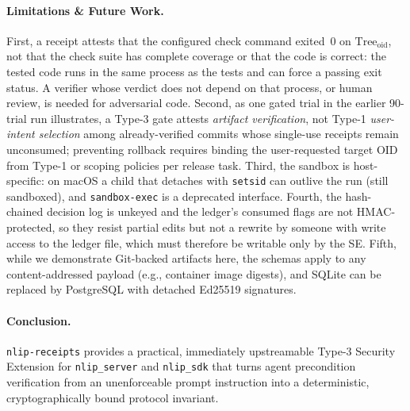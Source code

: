 \documentclass[sigconf,nonacm]{acmart}
\begin{document}
\paragraph{Limitations \& Future Work.}
First, a receipt attests that the configured check command exited~0 on $\text{Tree}_{\text{oid}}$, not that the check suite has complete coverage or that the code is correct: the tested code runs in the same process as the tests and can force a passing exit status. A verifier whose verdict does not depend on that process, or human review, is needed for adversarial code. Second, as one gated trial in the earlier 90-trial run illustrates, a Type-3 gate attests \emph{artifact verification}, not Type-1 \emph{user-intent selection} among already-verified commits whose single-use receipts remain unconsumed; preventing rollback requires binding the user-requested target OID from Type-1 or scoping policies per release task. Third, the sandbox is host-specific: on macOS a child that detaches with \texttt{setsid} can outlive the run (still sandboxed), and \texttt{sandbox-exec} is a deprecated interface. Fourth, the hash-chained decision log is unkeyed and the ledger's consumed flags are not HMAC-protected, so they resist partial edits but not a rewrite by someone with write access to the ledger file, which must therefore be writable only by the SE. Fifth, while we demonstrate Git-backed artifacts here, the schemas apply to any content-addressed payload (e.g., container image digests), and SQLite can be replaced by PostgreSQL with detached Ed25519 signatures.

\paragraph{Conclusion.}
\texttt{nlip-receipts} provides a practical, immediately upstreamable Type-3 Security Extension for \texttt{nlip\_server} and \texttt{nlip\_sdk} that turns agent precondition verification from an unenforceable prompt instruction into a deterministic, cryptographically bound protocol invariant.
\end{document}
